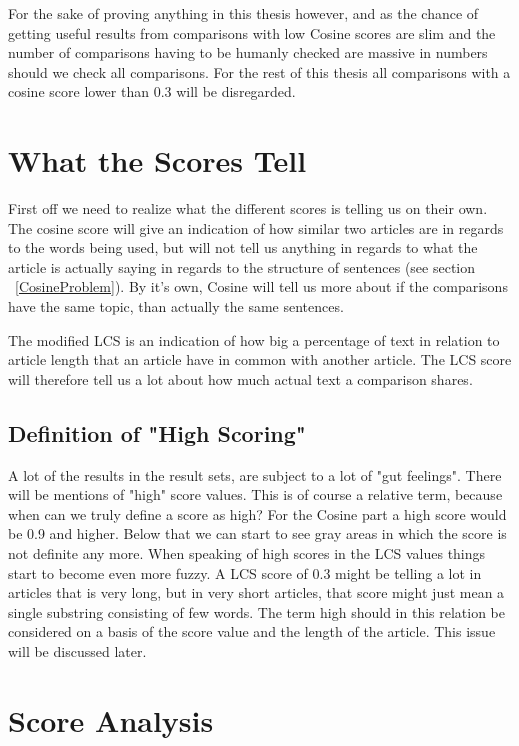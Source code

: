 For the sake of proving anything in this thesis however, and as the chance of getting useful results from comparisons with low Cosine scores are slim and the number of comparisons having to be humanly checked are massive in numbers should we check all comparisons. For the rest of this thesis all comparisons with a cosine score lower than 0.3 will be disregarded.

\section{What the Scores Tell}
First off we need to realize what the different scores is telling us on their own. The cosine score will give an indication of how similar two articles are in regards to the words being used, but will not tell us anything in regards to what the article is actually saying in regards to the structure of sentences (see section ~\ref{CosineProblem}). By it's own, Cosine will tell us more about if the comparisons have the same topic, than actually the same sentences. 

The modified LCS is an indication of how big a percentage of text in relation to article length that an article have in common with another article. The LCS score will therefore tell us a lot about how much actual text a comparison shares. 

\subsection{Definition of "High Scoring"}
A lot of the results in the result sets, are subject to a lot of "gut feelings". There will be mentions of "high" score values. This is of course a relative term, because when can we truly define a score as high? For the Cosine part a high score would be 0.9 and higher. Below that we can start to see gray areas in which the score is not definite any more. When speaking of high scores in the LCS values things start to become even more fuzzy. A LCS score of 0.3 might be telling a lot in articles that is very long, but in very short articles, that score might just mean a single substring consisting of few words. The term high should in this relation be considered on a basis of the score value and the length of the article. This issue will be discussed later.

\section{Score Analysis}

